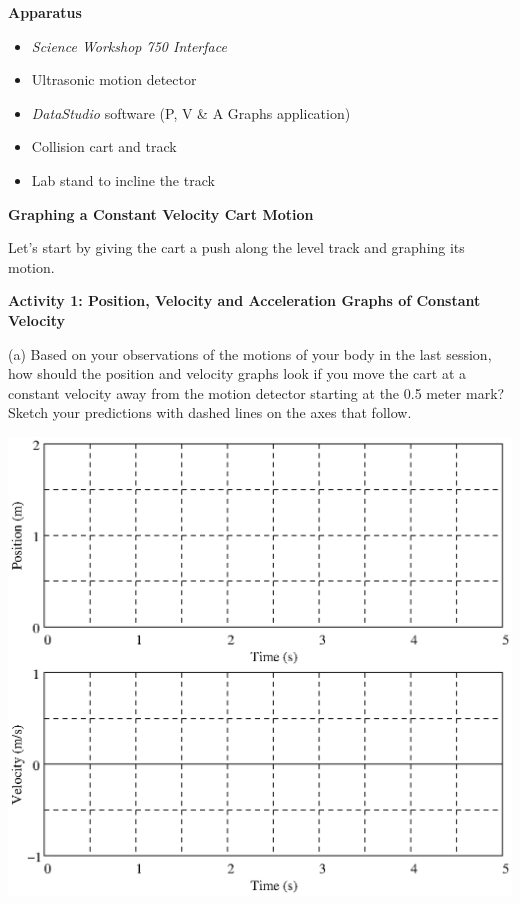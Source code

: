 \textbf{Apparatus} 

\begin{itemize}
\item \textit{Science Workshop 750 Interface}
\item Ultrasonic motion detector 
\item \textit{DataStudio} software (P, V \& A Graphs application)
\item Collision cart and track 
\item Lab stand to incline the track 
\end{itemize}
\textbf{Graphing a Constant Velocity Cart Motion }

Let's start by giving the cart a push along the level track and graphing its
motion. 

\textbf{Activity 1: Position, Velocity and Acceleration Graphs of Constant Velocity} 

(a) Based on your observations of the motions of your body in the last session,
how should the position and velocity graphs look if you move the cart at a constant
velocity away from the motion detector starting at the 0.5 meter mark? Sketch
your predictions with dashed lines on the axes that follow.

\vspace{0.3cm}
{\par\centering \includegraphics{changing/changing_fig1.eps} \par}
\vspace{0.3cm}

